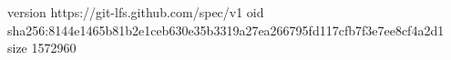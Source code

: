 version https://git-lfs.github.com/spec/v1
oid sha256:8144e1465b81b2e1ceb630e35b3319a27ea266795fd117cfb7f3e7ee8cf4a2d1
size 1572960

